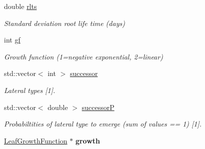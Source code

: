 \begin{DoxyCompactItemize}
\mbox{\label{classCPlantBox_1_1LeafRandomOrganParameter_a7b2de4fe287328091858d3d2d6cf63a8}} 
double \hyperlink{classCPlantBox_1_1LeafRandomOrganParameter_a7b2de4fe287328091858d3d2d6cf63a8}{rlts}
\begin{DoxyCompactList}\small\item\em Standard deviation root life time (days) \end{DoxyCompactList}\item 
\mbox{\label{classCPlantBox_1_1LeafRandomOrganParameter_abc948677e7e30e4a6c45f42164c2a7db}} 
int \hyperlink{classCPlantBox_1_1LeafRandomOrganParameter_abc948677e7e30e4a6c45f42164c2a7db}{gf}
\begin{DoxyCompactList}\small\item\em Growth function (1=negative exponential, 2=linear) \end{DoxyCompactList}\item 
\mbox{\label{classCPlantBox_1_1LeafRandomOrganParameter_ad7174d00ac1cd9177d9c9b01d1695696}} 
std\+::vector$<$ int $>$ \hyperlink{classCPlantBox_1_1LeafRandomOrganParameter_ad7174d00ac1cd9177d9c9b01d1695696}{successor}
\begin{DoxyCompactList}\small\item\em Lateral types \mbox{[}1\mbox{]}. \end{DoxyCompactList}\item 
\mbox{\label{classCPlantBox_1_1LeafRandomOrganParameter_a897da91db6a99dfe2575ba3f4dedcce6}} 
std\+::vector$<$ double $>$ \hyperlink{classCPlantBox_1_1LeafRandomOrganParameter_a897da91db6a99dfe2575ba3f4dedcce6}{successorP}
\begin{DoxyCompactList}\small\item\em Probabiltities of lateral type to emerge (sum of values == 1) \mbox{[}1\mbox{]}. \end{DoxyCompactList}\item 
\mbox{\label{classCPlantBox_1_1LeafRandomOrganParameter_a5905c78804b125b6aecc133616ba77ad}} 
\hyperlink{classCPlantBox_1_1LeafGrowthFunction}{Leaf\+Growth\+Function} $\ast$ {\bfseries growth}
\item 

\end{DoxyCompactItemize}
